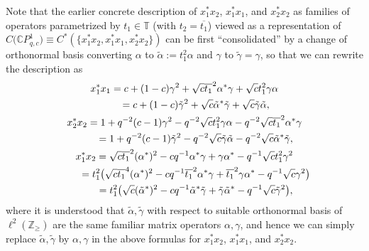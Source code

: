 Note that the earlier concrete description of $x_{1}^{\ast}x_{2}$,
$x_{1}^{\ast}x_{1}$, and $x_{2}^{\ast}x_{2}$ as families of operators
parametrized by $t_{1}\in\mathbb{T}$ (with $t_{2}=\overline{t_{1}}$) viewed as
a representation of $C\big(\mathbb{C}P_{q,c}^{1}\big) \equiv C^{\ast
} ( \{ x_{1}^{\ast}x_{2},x_{1}^{\ast}x_{1},\allowbreak x_{2}^{\ast}
x_{2} \} ) $ can be first ``consolidated'' by a change of orthonormal basis converting
$\alpha$ to $\tilde{\alpha}:=t_{1}^{2}\alpha$ and $\gamma$ to $\tilde{\gamma
}=\gamma$, so that we can rewrite the description as
\begin{gather*}
x_{1}^{\ast}x_{1} =c+(1-c) \gamma^{2}+\sqrt{c}%
\overline{t_{1}}^{2}\alpha^{\ast}\gamma+\sqrt{c}t_{1}^{2}\gamma\alpha\\
\hphantom{x_{1}^{\ast}x_{1}}{} =c+(1-c) \tilde{\gamma}^{2}+\sqrt{c}\tilde{\alpha}^{\ast
}\tilde{\gamma}+\sqrt{c}\tilde{\gamma}\tilde{\alpha},
\\
x_{2}^{\ast}x_{2} =1+q^{-2}(c-1) \gamma^{2}-q^{-2}\sqrt
{c}t_{1}^{2}\gamma\alpha-q^{-2}\sqrt{c}\overline{t_{1}}^{2}\alpha^{\ast}%
\gamma\\
\hphantom{x_{2}^{\ast}x_{2}}{} =1+q^{-2}(c-1) \tilde{\gamma}^{2}-q^{-2}\sqrt{c}\tilde
{\gamma}\tilde{\alpha}-q^{-2}\sqrt{c}\tilde{\alpha}^{\ast}\tilde{\gamma},
\\
x_{1}^{\ast}x_{2} =\sqrt{c}\overline{t_{1}}^{2} ( \alpha^{\ast
} ) ^{2}-cq^{-1}\alpha^{\ast}\gamma+\gamma\alpha^{\ast}-q^{-1}\sqrt
{c}t_{1}^{2}\gamma^{2}\\
\hphantom{x_{1}^{\ast}x_{2}}{}
 =t_{1}^{2}\big( \sqrt{c}\overline{t_{1}}^{4} ( \alpha^{\ast} )
^{2}-cq^{-1}\overline{t_{1}}^{2}\alpha^{\ast}\gamma+\overline{t_{1}}^{2}%
\gamma\alpha^{\ast}-q^{-1}\sqrt{c}\gamma^{2}\big) \\
\hphantom{x_{1}^{\ast}x_{2}}{} =t_{1}^{2}\big( \sqrt{c} ( \tilde{\alpha}^{\ast} )
^{2}-cq^{-1}\tilde{\alpha}^{\ast}\tilde{\gamma}+\tilde{\gamma}\tilde{\alpha
}^{\ast}-q^{-1}\sqrt{c}\tilde{\gamma}^{2}\big) ,
\end{gather*}
where it is understood that $\tilde{\alpha},\tilde{\gamma}$ with respect to
suitable orthonormal basis of $\ell^{2} ( \mathbb{Z}_{\geq} ) $ are
the same familiar matrix operators $\alpha,\gamma$, and hence we can simply
replace $\tilde{\alpha},\tilde{\gamma}$ by $\alpha,\gamma$ in the above
formulas for $x_{1}^{\ast}x_{2}$, $x_{1}^{\ast}x_{1}$, and $x_{2}^{\ast}x_{2}$.

